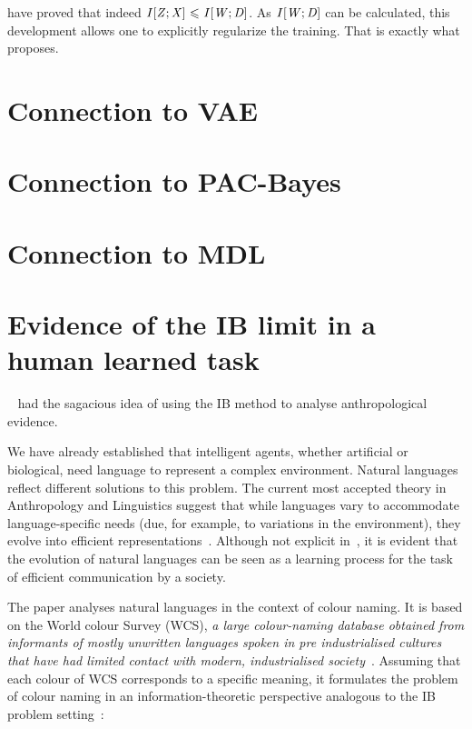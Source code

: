 \cite[Corollary C.8]{achille:2017emergence} have proved that indeed $I[{{\mathit{Z}}};{{\mathit{X}}}] {~\leqslant ~} I[{{\mathit{W}}};{{\mathit{D}}}]$. As $I[{{\mathit{W}}};{{\mathit{D}}}]$ can be calculated, this development allows one to explicitly regularize the training.  That is exactly what \cite[Information Dropout]{achille:2018dropout} proposes.

\section{Connection to VAE}
\section{Connection to PAC-Bayes}
\section{Connection to MDL}
\section{Evidence of the IB limit in a human learned task}\label{sec:efficient_color_naming}

    \citeauthor{zaslavsky:2018}~\cite{zaslavsky:2018} had the sagacious idea of using the IB method to analyse anthropological evidence.

    We have already established that intelligent agents, whether artificial or biological, need language to represent a complex environment. Natural languages reflect different solutions to this problem. The current most accepted theory in Anthropology and Linguistics suggest that while languages vary to accommodate language-specific needs (due, for example, to variations in the environment), they evolve into efficient representations~\cite{zaslavsky:2018}. Although not explicit in~\cite{zaslavsky:2018}, it is evident that the evolution of natural languages can be seen as a learning process for the task of efficient communication by a society.

    The paper analyses natural languages in the context of colour naming. It is based on the World colour Survey (WCS), \emph{a large colour-naming database obtained from informants of mostly unwritten languages spoken in pre industrialised cultures that have had limited contact with modern, industrialised society}~\cite{lindsey:2009}. Assuming that each colour of WCS corresponds to a specific meaning, it  formulates the problem of colour naming in an information-theoretic perspective analogous to the IB problem setting~\cite{tishby:1999}:

